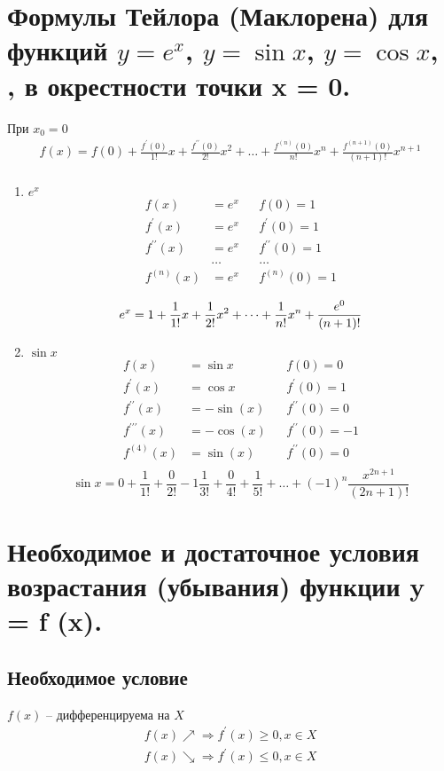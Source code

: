 \documentclass[12pt, fleqn]{article}
\begin{document}
\section{Формулы Тейлора (Маклорена) для функций $y = e^x$,  $y = \sin x$, $y = \cos x$, ,   в окрестности точки x = 0.}
При $x_0=0$
\begin{multline*}
	f(x)=f(0)+\frac{f^\prime(0)}{1!}x+\frac{f^{\prime\prime}(0)}{2!}x^2+\dots+\frac{f^{(n)}(0)}{n!}x^n+\frac{f^{(n+1)}(0)}{(n+1)!}x^{n+1}\\
\end{multline*}
\begin{enumerate}
	\item $e^x$
	\begin{align*}
		f(x) &= e^x&&f(0)=1\\
		f^\prime(x)&=e^x&&f^\prime(0)=1\\
		f^{\prime\prime}(x)&=e^x&&f^{\prime\prime}(0)=1\\
		&\dots&&\dots\\
		f^{(n)}(x)&=e^x&&f^{(n)}(0)=1\\
	\end{align*}
	$$e^x=1+\frac{1}{1!}x+\frac{1}{2!}x^2+\dots+\frac{1}{n!}x^n+\frac{e^0}{(n+1)!}\\$$
	\item $\sin x$
	\begin{align*}
		f(x) &= \sin x&&f(0)=0\\
		f^\prime(x)&=\cos x&&f^\prime(0)=1\\
		f^{\prime\prime}(x)&=-\sin(x)&&f^{\prime\prime}(0)=0\\
		f^{\prime\prime\prime}(x)&=-\cos(x)&&f^{\prime\prime}(0)=-1\\
		f^{(4)}(x)&=\sin(x)&&f^{\prime\prime}(0)=0\\
	\end{align*}
	$$\sin x=0+\frac{1}{1!}+\frac{0}{2!}-1\frac{1}{3!}+\frac{0}{4!}+\frac{1}{5!}+\dots+\left(-1\right)^n\frac{x^{2n+1}}{(2n+1)!}$$
\end{enumerate}
\section{Необходимое и достаточное условия возрастания (убывания) функции  y = f (x).}
\subsection{Необходимое условие}
$f(x)$ -- дифференцируема на $X$\\
\begin{multline*}
	f(x) \nearrow \Rightarrow f^\prime(x)\geq 0, x \in X\\
	f(x) \searrow \Rightarrow f^\prime(x)\leq 0, x \in X\\
\end{multline*}
\end{document}
